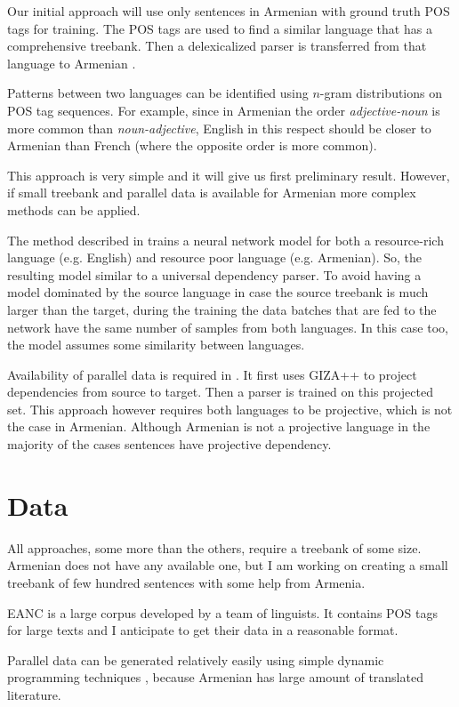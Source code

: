 \documentclass[]{article}
\begin{document}
Our initial approach will use only sentences in Armenian with ground truth POS tags for training.
The POS tags are used to find a similar language that has a comprehensive treebank.
Then a delexicalized parser is transferred from that language to Armenian \cite{google_delex_transfer}.

Patterns between two languages can be identified using $n$-gram distributions on POS tag sequences.
For example, since in Armenian the order \textit{adjective-noun} is more common than \textit{noun-adjective}, English in this respect should be closer to Armenian than French (where the opposite order is more common).

This approach is very simple and it will give us first preliminary result.
However, if small treebank and parallel data is available for Armenian more complex methods can be applied.

The method described in \cite{neural_net_duong} trains a neural network model for both a resource-rich language (e.g. English) and resource poor language (e.g. Armenian).
So, the resulting model similar to a universal dependency parser.
To avoid having a model dominated by the source language in case the source treebank is much larger than the target, during the training the data batches that are fed to the network have the same number of samples from both languages.
In this case too, the model assumes some similarity between languages.

Availability of parallel data is required in \cite{collins_density_transfer}.
It first uses GIZA++ \cite{giza_pp} to project dependencies from source to target.
Then a parser is trained on this projected set.
This approach however requires both languages to be projective, which is not the case in Armenian.
Although Armenian is not a projective language in the majority of the cases sentences have projective dependency.

\section{Data}
All approaches, some more than the others, require a treebank of some size.
Armenian does not have any available one, but I am working on creating a small treebank of few hundred sentences with some help from Armenia.

EANC \cite{eanc} is a large corpus developed by a team of linguists.
It contains POS tags for large texts and I anticipate to get their data in a reasonable format.

Parallel data can be generated relatively easily using simple dynamic programming techniques \cite{gale1993_alignment}, because Armenian has large amount of translated literature.



\end{document}
